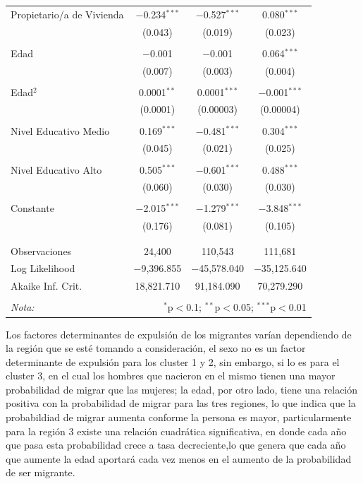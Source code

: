 \documentclass[12pt,a4paper]{article}
\begin{document}
\begin{table}[!htbp]
\begin{tabular}{@{\extracolsep{5pt}}lccc}
 Propietario/a de Vivienda & $-$0.234$^{***}$ & $-$0.527$^{***}$ & 0.080$^{***}$ \\ 
  & (0.043) & (0.019) & (0.023) \\ 
  & & & \\ 
 Edad & $-$0.001 & $-$0.001 & 0.064$^{***}$ \\ 
  & (0.007) & (0.003) & (0.004) \\ 
  & & & \\ 
 Edad$^2$ & 0.0001$^{**}$ & 0.0001$^{***}$ & $-$0.001$^{***}$ \\ 
  & (0.0001) & (0.00003) & (0.00004) \\ 
  & & & \\ 
 Nivel Educativo Medio & 0.169$^{***}$ & $-$0.481$^{***}$ & 0.304$^{***}$ \\ 
  & (0.045) & (0.021) & (0.025) \\ 
  & & & \\ 
 Nivel Educativo Alto & 0.505$^{***}$ & $-$0.601$^{***}$ & 0.488$^{***}$ \\ 
  & (0.060) & (0.030) & (0.030) \\ 
  & & & \\ 
 Constante & $-$2.015$^{***}$ & $-$1.279$^{***}$ & $-$3.848$^{***}$ \\ 
  & (0.176) & (0.081) & (0.105) \\ 
  & & & \\ 
\hline \\[-1.8ex] 
Observaciones & 24,400 & 110,543 & 111,681 \\ 
Log Likelihood & $-$9,396.855 & $-$45,578.040 & $-$35,125.640 \\ 
Akaike Inf. Crit. & 18,821.710 & 91,184.090 & 70,279.290 \\ 
\hline 
\hline \\[-1.8ex] 
\textit{Nota:}  & \multicolumn{3}{r}{$^{*}$p$<$0.1; $^{**}$p$<$0.05; $^{***}$p$<$0.01} \\ 
\end{tabular} 
\end{table} 

Los factores determinantes de expulsión de los migrantes varían dependiendo de la región que se esté tomando a consideración, el sexo no es un factor determinante de expulsión para los cluster 1 y 2, sin embargo, si lo es para el cluster 3, en el cual los hombres que nacieron en el mismo tienen una mayor probabilidad de migrar que las mujeres; la edad, por otro lado, tiene una relación positiva con la probabilidad de migrar para las tres regiones, lo que indica que la probabildiad de migrar aumenta conforme la persona es mayor, particularmente para la región 3 existe una relación cuadrática significativa, en donde cada año que pasa esta probabilidad crece a tasa decreciente,lo que genera que cada año que aumente la edad aportará cada vez menos en el aumento de  la probabilidad de ser migrante.
\end{document}
